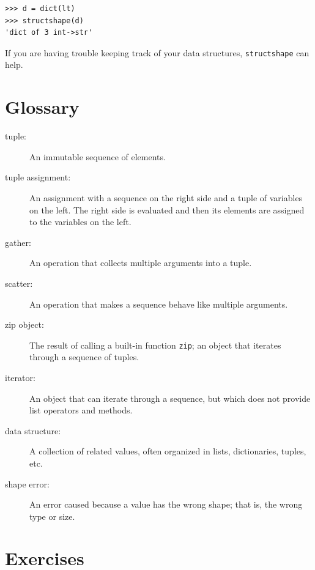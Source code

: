 \documentclass[10pt]{book}
\begin{document}
\begin{verbatim}
>>> d = dict(lt) 
>>> structshape(d)
'dict of 3 int->str'
\end{verbatim}
%
If you are having trouble keeping track of your data structures,
{\tt structshape} can help.


\section{Glossary}

\begin{description}

\item[tuple:] An immutable sequence of elements.

\item[tuple assignment:] An assignment with a sequence on the
right side and a tuple of variables on the left.  The right
side is evaluated and then its elements are assigned to the
variables on the left.

\item[gather:] An operation that collects multiple arguments into a tuple.

\item[scatter:] An operation that makes a sequence behave like multiple arguments.

\item[zip object:] The result of calling a built-in function {\tt zip};
an object that iterates through a sequence of tuples.

\item[iterator:] An object that can iterate through a sequence, but
which does not provide list operators and methods.

\item[data structure:] A collection of related values, often
organized in lists, dictionaries, tuples, etc.

\item[shape error:] An error caused because a value has the
wrong shape; that is, the wrong type or size.

\end{description}


\section{Exercises}
\end{document}
